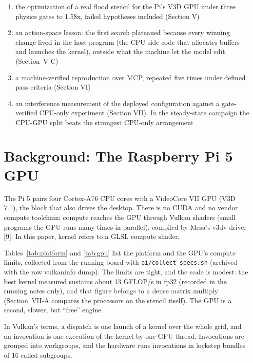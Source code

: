 \documentclass[conference]{IEEEtran}
\providecommand{\tightlist}{\setlength{\itemsep}{0pt}\setlength{\parskip}{0pt}}
\begin{document}
\begin{enumerate}
\def\labelenumi{\arabic{enumi}.}
\tightlist
\item
  the optimization of a real flood stencil for the Pi's V3D GPU under
  three physics gates to 1.58x, failed hypotheses included (Section V)
\item
  an action-space lesson: the first search plateaued because every
  winning change lived in the host program (the CPU-side code that
  allocates buffers and launches the kernel), outside what the machine
  let the model edit (\mbox{Section V-C})
\item
  a machine-verified reproduction over MCP, repeated five times under
  defined pass criteria (Section VI)
\item
  an interference measurement of the deployed configuration against a
  gate-verified CPU-only experiment (Section VII). In the steady-state
  campaign the CPU-GPU split beats the strongest CPU-only arrangement
\end{enumerate}

\section{Background: The Raspberry Pi 5
GPU}\label{background-the-raspberry-pi-5-gpu}

The Pi 5 pairs four Cortex-A76 CPU cores with a VideoCore VII GPU (V3D
7.1), the block that also drives the desktop. There is no CUDA and no
vendor compute toolchain; compute reaches the GPU through Vulkan shaders
(small programs the GPU runs many times in parallel), compiled by Mesa's
v3dv driver {[}9{]}. In this paper, kernel refers to a GLSL compute
shader.

Tables~\ref{tab:platform} and \ref{tab:gpu} list the
platform and the GPU's compute limits, collected from the running board
with \texttt{pi/collect\_specs.sh} (archived with the raw vulkaninfo
dump). The limits are tight, and the scale is modest: the best kernel
measured sustains about 13 GFLOP/s in fp32 (recorded in the running
notes only), and that figure belongs to a dense matrix multiply
(\mbox{Section VII-A} compares the processors on the stencil itself).
The GPU is a second, slower, but ``free'' engine.

In Vulkan's terms, a dispatch is one launch of a kernel over the whole
grid, and an invocation is one execution of the kernel by one GPU
thread. Invocations are grouped into workgroups, and the hardware runs
invocations in lockstep bundles of 16 called subgroups.
\end{document}

